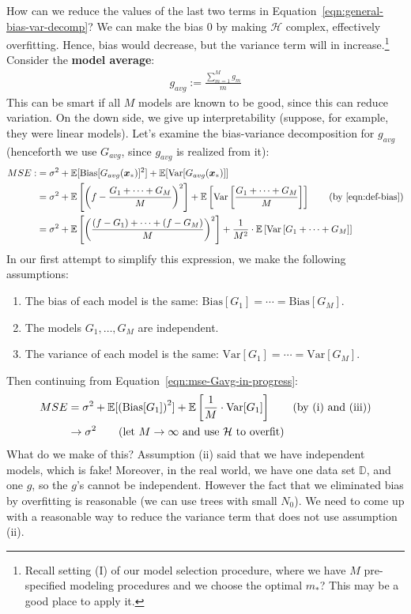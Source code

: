 \documentclass[12pt, a4paper]{article}
\theoremstyle{definition}
\begin{document}
	How can we reduce the values of the last two terms in
	Equation~\ref{eqn:general-bias-var-decomp}? We can make the bias $0$ by
	making $\mathcal{H}$ complex, effectively overfitting. Hence, bias would
	decrease, but the variance term will in increase.\footnote{Recall setting (I) of our
		model selection procedure, where we have $M$ pre-specified modeling procedures
		and we choose the optimal $m_*$? This may be a good place to apply it.}
	Consider the \textbf{model average}:
	\begin{align*}
		g_{avg} := \frac{\sum_{m=1}^{M}g_m}{m}
	\end{align*}
	This can be smart if all $M$ models are known to be good, since this can
	reduce variation. On the down side, we give up interpretability (suppose,
	for example, they were linear models). Let's examine the bias-variance decomposition
	for $g_{avg}$ (henceforth we use $G_{avg}$, since $g_{avg}$ is realized from it):
	\begin{align}
		MSE :
		&= \sigma^2 + \mathbb{E}[\text{Bias}[G_{avg}(\bm{x}_*)]^2]
		+\mathbb{E}[\text{Var}[G_{avg}(\bm{x}_{*})]]\nonumber\\
		&= \sigma^2 + \mathbb{E}\left[
			\left(
				f - \frac{G_1 + \cdots + G_M}{M} 
			\right)^2
		\right]
		+ \mathbb{E}\left[\text{Var}\left[\frac{G_1 + \cdots + G_M}{M}\right]\right]
		\tag{by \ref{eqn:def-bias}}
		\nonumber\\
		&= \sigma^2 + \mathbb{E}\left[
			\left(\frac{(f - G_1) + \cdots + (f - G_M)}{M}\right)^2
		\right]
		+ \frac{1}{M^2}\cdot \mathbb{E}\left[\text{Var}\left[G_1 + \cdots + G_M \right]\right]
		\label{eqn:mse-Gavg-in-progress}
	\end{align}
	In our first attempt to simplify this expression, we make the following assumptions:
	\begin{enumerate}[label=(\roman*)]
		\item The bias of each model is the same: $\text{Bias}[G_1]=\cdots=\text{Bias}[G_M]$.
		\item The models $G_1,\ldots,G_M$ are independent.
		\item The variance of each model is the same:
		$\text{Var}[G_1] = \cdots = \text{Var}[G_M]$.
	\end{enumerate}
	Then continuing from Equation~\ref{eqn:mse-Gavg-in-progress}:
	\begin{align*}
		MSE &=\sigma^2 + \mathbb{E}[\left(\text{Bias}[G_1]\right)^2]
		+\mathbb{E}\left[
		\frac{1}{M}\cdot \text{Var}[G_1]
		\right]
		\tag{by (i) and (iii)}\\
		&\to \sigma^2
		\tag{let $M\to\infty$ and use $\mathcal{H}$ to overfit}
	\end{align*}
	What do we make of this? Assumption (ii) said that we have independent models,
	which is fake! Moreover, in the real world, we have one data set $\mathbb{D}$,
	and one $g$, so the $g$'s cannot be independent. However the fact that we
	eliminated bias by overfitting is reasonable (we can use trees with small $N_0$).
	We need to come up with a reasonable way to reduce the variance term that does
	not use assumption (ii).
\end{document}
